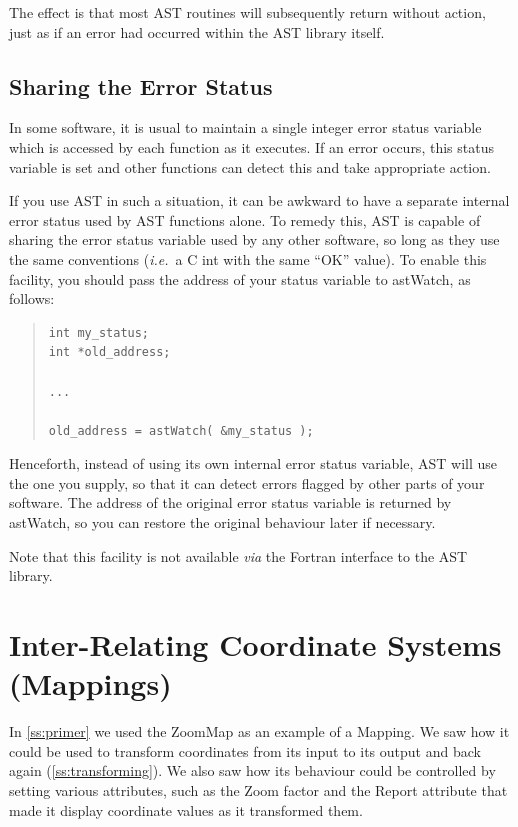 \documentclass[twoside,11pt]{article}
\newcommand{\htmlref}[2]{#1}
\newcommand{\secref}[1]{\S\ref{#1}}
\renewcommand{\secref}[1]{\ref{#1}}
\begin{document}
The effect is that most AST routines will subsequently return without
action, just as if an error had occurred within the AST library
itself.

\subsection{Sharing the Error Status}

In some software, it is usual to maintain a single integer error
status variable which is accessed by each function as it executes. If
an error occurs, this status variable is set and other functions can
detect this and take appropriate action.

If you use AST in such a situation, it can be awkward to have a
separate internal error status used by AST functions alone. To remedy
this, AST is capable of sharing the error status variable used by any
other software, so long as they use the same conventions
({\em{i.e.}}\ a C int with the same ``OK'' value). To enable this
facility, you should pass the address of your status variable to
\htmlref{astWatch}{astWatch}, as follows:

\begin{quote}
\small
\begin{verbatim}
int my_status;
int *old_address;

...

old_address = astWatch( &my_status );
\end{verbatim}
\normalsize
\end{quote}

Henceforth, instead of using its own internal error status variable,
AST will use the one you supply, so that it can detect errors flagged
by other parts of your software. The address of the original error
status variable is returned by astWatch, so you can restore the
original behaviour later if necessary.

Note that this facility is not available {\em{via}} the Fortran
interface to the AST library.

\cleardoublepage
%
\section{\label{ss:mappings}Inter-Relating Coordinate Systems (Mappings)}

In \secref{ss:primer} we used the \htmlref{ZoomMap}{ZoomMap} as an example of a
\htmlref{Mapping}{Mapping}. We saw how it could be used to transform coordinates from its
input to its output and back again (\secref{ss:transforming}). We also
saw how its behaviour could be controlled by setting various
attributes, such as the \htmlref{Zoom}{Zoom} factor and the \htmlref{Report}{Report} attribute that made
it display coordinate values as it transformed them.
\end{document}
